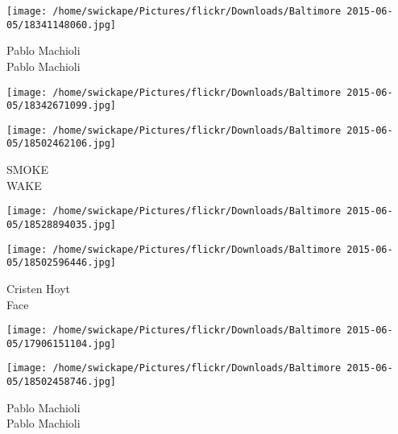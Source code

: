 \documentclass[10pt,letterpaper]{article}
\begin{document}
\vspace{0.25in}
\texttt{[image: /home/swickape/Pictures/flickr/Downloads/Baltimore 2015-06-05/18341148060.jpg]}

Pablo Machioli\\
Pablo Machioli\\
\pagebreak

\texttt{[image: /home/swickape/Pictures/flickr/Downloads/Baltimore 2015-06-05/18342671099.jpg]}

\vspace{0.25in}
\texttt{[image: /home/swickape/Pictures/flickr/Downloads/Baltimore 2015-06-05/18502462106.jpg]}

SMOKE\\
WAKE\\
\pagebreak

\texttt{[image: /home/swickape/Pictures/flickr/Downloads/Baltimore 2015-06-05/18528894035.jpg]}

\vspace{0.25in}
\texttt{[image: /home/swickape/Pictures/flickr/Downloads/Baltimore 2015-06-05/18502596446.jpg]}

Cristen Hoyt\\
Face\\
\pagebreak

\texttt{[image: /home/swickape/Pictures/flickr/Downloads/Baltimore 2015-06-05/17906151104.jpg]}

\vspace{0.25in}
\texttt{[image: /home/swickape/Pictures/flickr/Downloads/Baltimore 2015-06-05/18502458746.jpg]}

Pablo Machioli\\
Pablo Machioli\\
\pagebreak
\end{document}
